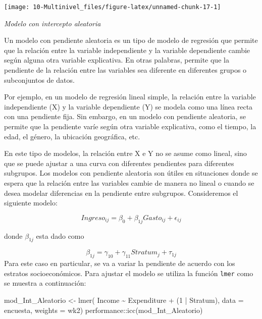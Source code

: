 \documentclass[
  12pt,
]{book}
\newenvironment{Shaded}{\begin{snugshade}}{\end{snugshade}}
\newcommand{\AttributeTok}[1]{\textcolor[rgb]{0.77,0.63,0.00}{#1}}
\newcommand{\DecValTok}[1]{\textcolor[rgb]{0.00,0.00,0.81}{#1}}
\newcommand{\FunctionTok}[1]{\textcolor[rgb]{0.00,0.00,0.00}{#1}}
\newcommand{\NormalTok}[1]{#1}
\newcommand{\OtherTok}[1]{\textcolor[rgb]{0.56,0.35,0.01}{#1}}
\newcommand{\SpecialCharTok}[1]{\textcolor[rgb]{0.00,0.00,0.00}{#1}}
\begin{document}
\texttt{[image: 10-Multinivel\_files/figure-latex/unnamed-chunk-17-1]}

\emph{Modelo con intercepto aleatoria}

Un modelo con pendiente aleatoria es un tipo de modelo de regresión que permite que la relación entre la variable independiente y la variable dependiente cambie según alguna otra variable explicativa. En otras palabras, permite que la pendiente de la relación entre las variables sea diferente en diferentes grupos o subconjuntos de datos.

Por ejemplo, en un modelo de regresión lineal simple, la relación entre la variable independiente (X) y la variable dependiente (Y) se modela como una línea recta con una pendiente fija. Sin embargo, en un modelo con pendiente aleatoria, se permite que la pendiente varíe según otra variable explicativa, como el tiempo, la edad, el género, la ubicación geográfica, etc.

En este tipo de modelos, la relación entre X e Y no se asume como lineal, sino que se puede ajustar a una curva con diferentes pendientes para diferentes subgrupos. Los modelos con pendiente aleatoria son útiles en situaciones donde se espera que la relación entre las variables cambie de manera no lineal o cuando se desea modelar diferencias en la pendiente entre subgrupos. Consideremos el siguiente modelo:

\[
Ingreso_{ij}=\beta_{0}+\beta_{1j}Gasto_{ij}+\epsilon_{ij}
\]

donde \(\beta_{1j}\) esta dado como

\[
\beta_{1j} = \gamma_{10}+\gamma_{11}Stratum_{j} + \tau_{1j}
\]
Para este caso en particular, se va a variar la pendiente de acuerdo con los estratos socioeconómicos. Para ajustar el modelo se utiliza la función \texttt{lmer} como se muestra a continuación:

\begin{Shaded}
\begin{Highlighting}[]
\NormalTok{mod\_Int\_Aleatorio }\OtherTok{\textless{}{-}} \FunctionTok{lmer}\NormalTok{( Income }\SpecialCharTok{\textasciitilde{}}\NormalTok{ Expenditure  }\SpecialCharTok{+}\NormalTok{ (}\DecValTok{1} \SpecialCharTok{|}\NormalTok{ Stratum),}
  \AttributeTok{data =}\NormalTok{ encuesta, }\AttributeTok{weights  =}\NormalTok{  wk2)}
\NormalTok{performance}\SpecialCharTok{::}\FunctionTok{icc}\NormalTok{(mod\_Int\_Aleatorio)}
\end{Highlighting}
\end{Shaded}
\end{document}
